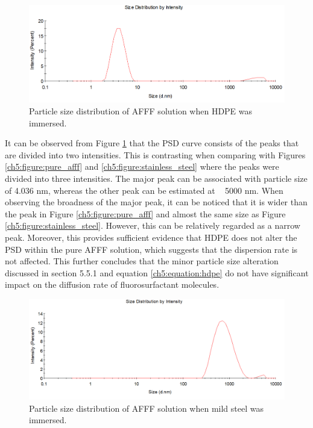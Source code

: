 \documentclass[12pt]{report}
\begin{document}
\begin{figure}[H]
    \centering
    \includegraphics[width=.8\textwidth]{particle_size_distribution_of_afff_solution_when_hdpe_was_immersed.png}
    \caption{Particle size distribution of AFFF solution when HDPE was immersed.}
    \label{ch5:figure:hdpe}
\end{figure}

It can be observed from Figure \ref{ch5:figure:hdpe} that the PSD curve consists of the peaks that are divided into two intensities. This is contrasting when comparing with Figures \ref{ch5:figure:pure_afff} and \ref{ch5:figure:stainless_steel} where the peaks were divided into three intensities. The major peak can be associated with particle size of 4.036 nm, whereas the other peak can be estimated at ~ 5000 nm. When observing the broadness of the major peak, it can be noticed that it is wider than the peak in Figure \ref{ch5:figure:pure_afff} and almost the same size as Figure \ref{ch5:figure:stainless_steel}. However, this can be relatively regarded as a narrow peak. Moreover, this provides sufficient evidence that HDPE does not alter the PSD within the pure AFFF solution, which suggests that the dispersion rate is not affected. This further concludes that the minor particle size alteration discussed in section 5.5.1 and equation \ref{ch5:equation:hdpe} do not have significant impact on the diffusion rate of fluorosurfactant molecules.    
  
\begin{figure}[H]
    \centering
    \includegraphics[width=.8\textwidth]{particle_size_distribution_of_afff_solution_when_mild_steel_was_immersed.png}
    \caption{Particle size distribution of AFFF solution when mild steel was immersed.}
    \label{ch5:figure:mild_steel}
\end{figure}
\end{document}
